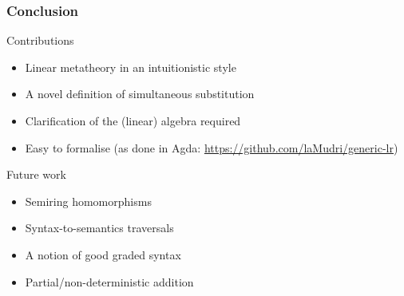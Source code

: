 \documentclass[fleqn]{beamer}
\begin{document}
\begin{frame}
  \frametitle{Conclusion}
  \begin{block}{Contributions}
    \begin{itemize}
      \item Linear metatheory in an intuitionistic style
      \item A novel definition of simultaneous substitution
      \item Clarification of the (linear) algebra required
      \item Easy to formalise (as done in Agda:
        \url{https://github.com/laMudri/generic-lr})
    \end{itemize}
  \end{block}
  \begin{block}{Future work}
    \begin{itemize}
      \item Semiring homomorphisms
      \item Syntax-to-semantics traversals
      \item A notion of good graded syntax
      \item Partial/non-deterministic addition
    \end{itemize}
  \end{block}
\end{frame}
\end{document}
